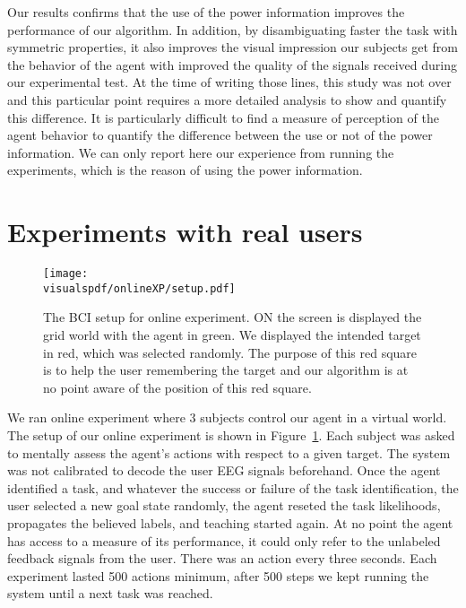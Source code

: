 Our results confirms that the use of the power information improves the performance of our algorithm. In addition, by disambiguating faster the task with symmetric properties, it also improves the visual impression our subjects get from the behavior of the agent with improved the quality of the signals received during our experimental test. At the time of writing those lines, this study was not over and this particular point requires a more detailed analysis to show and quantify this difference. It is particularly difficult to find a measure of perception of the agent behavior to quantify the difference between the use or not of the power information. We can only report here our experience from running the experiments, which is the reason of using the power information.

\section{Experiments with real users}

\begin{figure}[!ht]
\centering
\texttt{[image: \\visualspdf/onlineXP/setup.pdf]}
\caption{The BCI setup for online experiment. ON the screen is displayed the grid world with the agent in green. We displayed the intended target in red, which was selected randomly. The purpose of this red square is to help the user remembering the target and our algorithm is at no point aware of the position of this red square.}
\label{fig:BCIsetup}
\end{figure}

We ran online experiment where 3 subjects  control our agent in a virtual world. The setup of our online experiment is shown in Figure~\ref{fig:BCIsetup}. Each subject was asked to mentally assess the agent's actions with respect to a given target. The system was not calibrated to decode the user EEG signals beforehand. Once the agent identified a task, and whatever the success or failure of the task identification, the user selected a new goal state randomly, the agent reseted the task likelihoods, propagates the believed labels, and teaching started again. At no point the agent has access to a measure of its performance, it could only refer to the unlabeled feedback signals from the user. There was an action every three seconds. Each experiment lasted 500 actions minimum, after 500 steps we kept running the system until a next task was reached.

